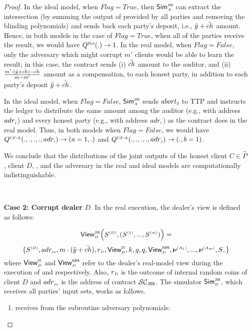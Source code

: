 \begin{proof}
In the ideal model, when $Flag=True$, then $\mathsf{Sim}^{\scriptscriptstyle \mathtt{JUS}}_{\scriptscriptstyle A}$ can extract the intersection (by summing the output of \vopr provided by all parties and removing the blinding polynomials) and sends back each party's deposit, i.e., $\ddot{y}+\ddot{ch}$ amount. Hence, in both models in the case of $Flag=True$, when all of the parties receive the result, we would have $Q^{\scriptscriptstyle \text{Del}}(.)\rightarrow 1$. In the real model, when $Flag=False$, only the adversary which might corrupt $m'$ clients would be able to learn the result; in this case, the contract sends (i) $\ddot{ch}$ amount to the auditor, and (ii) $\frac{m'\cdot (\ddot{y}+\ddot{ch})-\ddot{ch}}{m-m'}$ amount as a compensation, to each honest party, in addition to each party's deposit $\ddot{y}+\ddot{ch}$. 

In the ideal model,  when $Flag=False$, $\mathsf{Sim}^{\scriptscriptstyle \mathtt{JUS}}_{\scriptscriptstyle A}$  sends $abort_{\scriptscriptstyle 3}$ to TTP and instructs the ledger to distribute the same amount among the auditor (e.g., with address $adr_{\scriptscriptstyle j}$) and every honest party (e.g., with address $adr_{\scriptscriptstyle i}$) as the contract does in the real model. Thus, in both models when $Flag=False$, we would have $Q^{\scriptscriptstyle \text{UF-A}}(., ., ., ., adr_{\scriptscriptstyle i})\rightarrow (a=1, .)$ and  $Q^{\scriptscriptstyle \text{UF-A}}(., ., ., ., adr_{\scriptscriptstyle j})\rightarrow (., b=1)$. 

We conclude that the distributions of the joint outputs of the honest client $C\in \hat P$, client $D$, \aud, and the adversary in the real and ideal models are computationally indistinguishable.


\

\noindent\textbf{Case 2: Corrupt dealer $D$}.  In the real execution, the dealer's view is defined as follows: 


$$ \mathsf{View}_{\scriptscriptstyle D}^{\scriptscriptstyle \mathtt{JUS}} \Big(S^{\scriptscriptstyle (D)},(S^{\scriptscriptstyle (1)},..., S^{\scriptscriptstyle (m)})\Big)=$$ $$ \{S^{\scriptscriptstyle (D)}, adr_{\scriptscriptstyle sc}, m\cdot(\ddot{y}+\ddot{ch}), r_{\scriptscriptstyle D}, \mathsf{View}^{\scriptscriptstyle \mathtt{CT}}_{\scriptscriptstyle D}, k, g, q, \mathsf{View}^{\scriptscriptstyle \mathtt{VOPR}}_{\scriptscriptstyle D}, \bm\nu^{\scriptscriptstyle (A_1)},..., \bm\nu^{\scriptscriptstyle (A_m)}, S_{\scriptscriptstyle \cap}\}$$
%
where  $\mathsf{View}^{\scriptscriptstyle \mathtt{CT}}_{\scriptscriptstyle D}$ and $\mathsf{View}^{\scriptscriptstyle \mathtt{VOPR}}_{\scriptscriptstyle D}$ refer to the dealer's real-model view during the execution of \ct and \vopr respectively. Also, $r_{\scriptscriptstyle D}$ is the outcome of internal random coins of client $D$ and $adr_{\scriptscriptstyle sc}$ is the address of contract $\mathcal{SC}_{\mathtt{JUS}}$. The simulator $\mathsf{Sim}^{\scriptscriptstyle \mathtt{JUS}}_{\scriptscriptstyle D}$, which receives all parties' input sets, works as follows. 

\begin{enumerate}

\item receives from the subroutine adversary polynomials:


\end{enumerate}
\end{proof}
